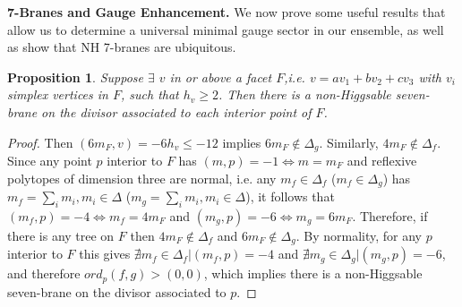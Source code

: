 \documentclass[aps,prl,twocolumn, superscriptaddress,groupedaddress,nofootinbib]{revtex4-1}
\newtheorem{prop}{Proposition}
\begin{document}

\vspace{.2cm}
\noindent \textbf{7-Branes and Gauge Enhancement.}
We now prove some useful results that allow us to determine a universal minimal gauge sector in our ensemble, as well as show that NH 7-branes are ubiquitous.
\begin{prop}
\label{prop:NH7fromsingletree}
Suppose $\exists$ $v$ in or above a facet $F$,i.e. $v=av_1+bv_2+cv_3$ with $v_i$ simplex vertices in $F$, such that $h_v\geq 2$. Then there is a non-Higgsable seven-brane on the divisor associated
to each interior point of $F$.
\end{prop}

\begin{proof}
Then $(6 m_F,v)=-6h_v \leq -12$ implies $6m_F \notin \Delta_g$.
Similarly, $4m_F \notin \Delta_f$. Since any point $p$ interior to $F$ has 
$(m,p)=-1 \iff m=m_F$ and reflexive polytopes of dimension three
are normal, i.e. any $m_f\in \Delta_f$ ($m_f \in \Delta_g$) has
$m_f = \sum_i m_i, m_i\in \Delta$ ($m_g = \sum_i m_i, m_i\in \Delta$),
it follows that $(m_f,p)=-4 \iff m_f = 4m_F$ and $(m_g,p)=-6 \iff m_g = 6m_F$. Therefore, if there is any tree on $F$
then $4m_F \notin \Delta_f$ and $6m_F\notin \Delta_g$. By normality,
for any $p$ interior to $F$ this gives
$\nexists m_f \in \Delta_f | (m_f,p)=-4$ and
$\nexists m_g \in \Delta_g | (m_g,p)=-6$, and therefore $ord_p(f,g) > (0,0)$,
which implies there is a non-Higgsable seven-brane on the divisor associated to $p$.
\end{proof}
\end{document}
